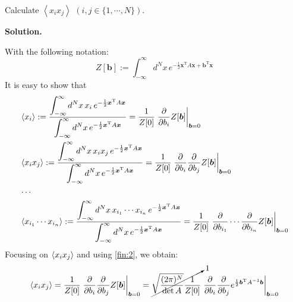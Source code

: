 \documentclass[11pt,a4paper]{article}
\newcounter{problem}
\newcounter{saveequation}
\newenvironment{solution}
{
	\par
	\setcounter{saveequation}{\value{equation}}
	\begingroup
	\setcounter{equation}{0}
	\renewcommand{\theequation}{\arabic{problem}.\arabic{equation}}
	\renewcommand{\theHequation}{sol.\arabic{problem}.\arabic{equation}}
	\noindent\textbf{Solution.}\quad
}
{
	\par
	\endgroup
	\setcounter{equation}{\value{saveequation}}
}
\begin{document}
	\begin{problembox}
		Calculate $\left\langle x_i x_j \right\rangle$ $(i,j\in\{1,\cdots,N\})$.
	\end{problembox}
	\begin{solution}
		With the following notation:
		\begin{equation}
			Z[\boldsymbol{b}]:=\int_{-\infty}^{\infty} d^N x\, e^{-\frac{1}{2}\boldsymbol{x}^{\mathrm{T}}A\boldsymbol{x}+\boldsymbol{b}^{\mathrm{T}}\boldsymbol{x}}
		\end{equation}
		It is easy to show that
		\begin{equation}
			\begin{aligned}
				& \braket{x_i}:=\frac{\displaystyle \int_{-\infty}^{\infty} d^N x\, x_i\, e^{-\frac{1}{2}\boldsymbol{x}^{\mathrm{T}}A\boldsymbol{x}}}
				{\displaystyle \int_{-\infty}^{\infty} d^N x\, e^{-\frac{1}{2}\boldsymbol{x}^{\mathrm{T}}A\boldsymbol{x}}}=\frac{1}{Z[0]}\left.\frac{\partial}{\partial b_i}Z[\boldsymbol{b}]\right|_{\boldsymbol{b}=0}\\
				& \braket{x_ix_j}:=\frac{\displaystyle \int_{-\infty}^{\infty} d^N x\, x_ix_j\, e^{-\frac{1}{2}\boldsymbol{x}^{\mathrm{T}}A\boldsymbol{x}}}
				{\displaystyle \int_{-\infty}^{\infty} d^N x\, 	e^{-\frac{1}{2}\boldsymbol{x}^{\mathrm{T}}A\boldsymbol{x}}}=\frac{1}{Z[0]}\left.\frac{\partial}{\partial b_i}\frac{\partial}{\partial b_j}Z[\boldsymbol{b}]\right|_{\boldsymbol{b}=0}\\
				&\cdots\\
				& \braket{x_{i_1}\cdots x_{i_n}}:=\frac{\displaystyle \int_{-\infty}^{\infty} d^N x\, x_{i_1}\cdots x_{i_n}\, e^{-\frac{1}{2}\boldsymbol{x}^{\mathrm{T}}A\boldsymbol{x}}}
				{\displaystyle \int_{-\infty}^{\infty} d^N x\, 	e^{-\frac{1}{2}\boldsymbol{x}^{\mathrm{T}}A\boldsymbol{x}}}=\frac{1}{Z[0]}\left.\frac{\partial}{\partial b_{i_1}}\cdots\frac{\partial}{\partial b_{i_n}}Z[\boldsymbol{b}]\right|_{\boldsymbol{b}=0}\\
			\end{aligned}
		\end{equation}
	Focusing on $\braket{x_ix_j}$ and using \eqref{fin:2}, we obtain:
	\begin{equation}
		\begin{aligned}
			\braket{x_ix_j}&=\frac{1}{Z[0]}\left.\frac{\partial}{\partial b_i}\frac{\partial}{\partial b_j}Z[\boldsymbol{b}]\right|_{\boldsymbol{b}=0}=\cancelto{1}{\sqrt{\frac{(2\pi)^{N}}{\det A}}\frac{1}{Z[0]}}\left.\frac{\partial}{\partial b_i}\frac{\partial}{\partial b_j} e^{\frac12 \boldsymbol{b}^\mathrm{T} A^{-1} \boldsymbol{b}}\right|_{\boldsymbol{b}=0}\\

\end{aligned}
\end{equation}
\end{solution}
\end{document}
